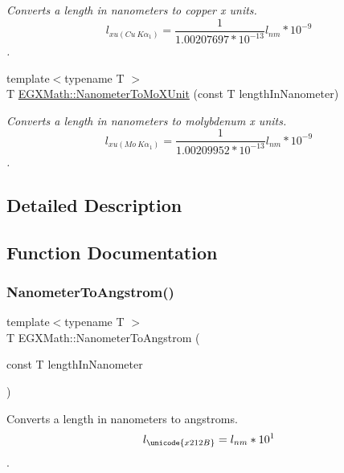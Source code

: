 \begin{DoxyCompactItemize}
\begin{DoxyCompactList}\small\item\em Converts a length in nanometers to copper x units. \[ l_{xu(Cu\ K\alpha_1)}= \frac{1}{1.00207697*10^{-13}} l_{nm} * 10^{-9}\]. \end{DoxyCompactList}\item 
{\footnotesize template$<$typename T $>$ }\\T \mbox{\hyperlink{group___e_g_x_math-_conversions-_length_conversions-_nanometer-_non-_s_i_gacc6d7fa95c35687718c816df3c95c7b5}{E\+G\+X\+Math\+::\+Nanometer\+To\+Mo\+X\+Unit}} (const T length\+In\+Nanometer)
\begin{DoxyCompactList}\small\item\em Converts a length in nanometers to molybdenum x units. \[ l_{xu(Mo\ K\alpha_1)}=\frac{1}{1.00209952*10^{-13}} l_{nm} * 10^{-9}\]. \end{DoxyCompactList}\end{DoxyCompactItemize}


\subsection{Detailed Description}


\subsection{Function Documentation}
\mbox{\label{group___e_g_x_math-_conversions-_length_conversions-_nanometer-_non-_s_i_ga7e2062d4cc1a422e54da597c4413efb1}} 
\subsubsection{\texorpdfstring{Nanometer\+To\+Angstrom()}{NanometerToAngstrom()}}
{\footnotesize\ttfamily template$<$typename T $>$ \\
T E\+G\+X\+Math\+::\+Nanometer\+To\+Angstrom (\begin{DoxyParamCaption}\item[{const T}]{length\+In\+Nanometer }\end{DoxyParamCaption})}



Converts a length in nanometers to angstroms. \[ l_{\unicode{x212B}}=l_{nm} * 10^{1} \]. 

